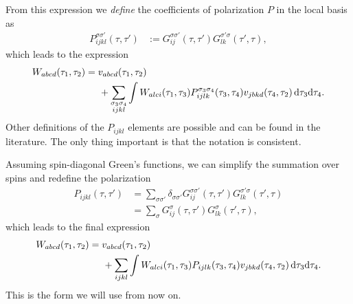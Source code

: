 \documentclass[12pt,a4paper]{scrartcl}
\numberwithin{equation}{section}
\begin{document}
From this expression we \textit{define} the coefficients of  polarization $P$ in
the local basis as
\begin{align}
 P^{\sigma\sigma'}_{ijkl}(\tau,\tau') 
 &:= G^{\sigma\sigma'}_{ij}(\tau,\tau') G^{\sigma'\sigma}_{lk}(\tau',\tau),
\end{align}
which leads to the expression
\begin{align}
W_{abcd}(\tau_1,\tau_2) 
%
&= v_{abcd}(\tau_1,\tau_2)  \nonumber \\ 
& \hspace{0.5cm}  + \sum_{\substack{\sigma_3\sigma_4 \\ ijkl }}\int 
                     W_{alci}(\tau_1,\tau_3) 
                     P^{\sigma_3\sigma_4}_{ijlk}(\tau_3,\tau_4) 
                     v_{jbkd}(\tau_4,\tau_2)
                    \, \mathrm{d}\tau_3\mathrm{d}\tau_4 .
%
\end{align}
Other definitions of the $P_{ijkl}$ elements are possible and can be found in the literature.
The only thing important is that the notation is consistent.

Assuming spin-diagonal Green's functions, we can simplify the summation
over spins and redefine the polarization
\begin{align}
 P_{ijkl}(\tau,\tau') 
 &=\sum_{\sigma\sigma'} \delta_{\sigma\sigma'}G^{\sigma\sigma'}_{ij}(\tau,\tau') G^{\sigma'\sigma}_{lk}(\tau',\tau) \\
 &=\sum_{\sigma} G^{\sigma}_{ij}(\tau,\tau') G^{\sigma}_{lk}(\tau',\tau) ,
\end{align}
which leads to the final expression
\begin{align}
W_{abcd}(\tau_1,\tau_2) 
%
&= v_{abcd}(\tau_1,\tau_2)  \nonumber \\ 
& \hspace{0.5cm}  + \sum_{ijkl}\int 
                     W_{alci}(\tau_1,\tau_3) 
                     P_{ijlk}(\tau_3,\tau_4) 
                     v_{jbkd}(\tau_4,\tau_2)
                    \, \mathrm{d}\tau_3\mathrm{d}\tau_4 .
%
\end{align}
This is the form we will use from now on.

\end{document}
